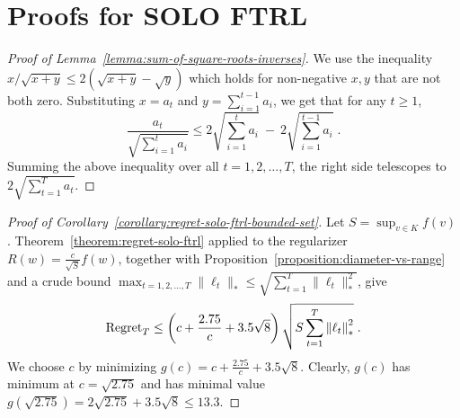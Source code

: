 \section{Proofs for \textsc{SOLO FTRL}}
\label{section:solo-ftrl-proofs}

\begin{proof}[Proof of Lemma~\ref{lemma:sum-of-square-roots-inverses}]
We use the inequality $x/\sqrt{x+y} \le 2(\sqrt{x+y} - \sqrt{y})$ which holds
for non-negative $x,y$ that are not both zero. Substituting $x = a_t$ and $y=\sum_{i=1}^{t-1} a_i$,
we get that for any $t \ge 1$,
$$
\frac{a_t}{\sqrt{\sum_{i=1}^t a_i}} \le 2 \sqrt{\sum_{i=1}^t a_i} \ - \ 2 \sqrt{\sum_{i=1}^{t-1} a_i} \; .
$$
Summing the above inequality over all $t=1,2,\dots,T$, the right side telescopes to
$2 \sqrt{\sum_{t=1}^T a_t}$.
\end{proof}

\begin{proof}[Proof of Corollary~\ref{corollary:regret-solo-ftrl-bounded-set}]
Let $S = \sup_{v \in K} f(v)$. Theorem~\ref{theorem:regret-solo-ftrl} applied
to the regularizer $R(w) = \frac{c}{\sqrt{S}} f(w)$, together with
Proposition~\ref{proposition:diameter-vs-range} and a crude bound
$\max_{t=1,2,\dots,T} \|\ell_t\|_* \le \sqrt{\sum_{t=1}^T \|\ell_t\|_*^2}$,
give
$$
\operatorname{Regret}_T \le \left(c + \frac{2.75}{c}  + 3.5\sqrt{8} \right) \sqrt{S \sum_{t=1}^{T} {\left\|{\ell_t}\right\|}_*^2} \; .
$$
We choose $c$ by minimizing $g(c) = c + \frac{2.75}{c} + 3.5\sqrt{8}$. Clearly,
$g(c)$ has minimum at $c = \sqrt{2.75}$ and has minimal value $g(\sqrt{2.75}) =
2\sqrt{2.75} + 3.5\sqrt{8} \le 13.3$.
\end{proof}
